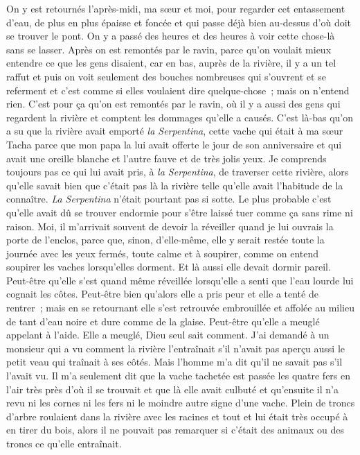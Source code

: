 \pend
%
\pstart
	On y est retournés l’après-midi, ma sœur et moi, pour regarder cet entassement d’eau, de plus en plus épaisse et foncée et qui passe déjà bien au-dessus d’où doit se trouver le pont. On y a passé des heures et des heures à voir cette chose-là sans se lasser. Après on est remontés par le ravin, parce qu’on voulait mieux entendre ce que les gens disaient, car en bas, auprès de la rivière, il y a un tel raffut et puis on voit seulement des bouches nombreuses qui s’ouvrent et se referment et c’est comme si elles voulaient dire quelque-chose ; mais on n’entend rien. C’est pour ça qu’on est remontés par le ravin, où il y a aussi des gens qui regardent la rivière et comptent les dommages qu’elle a causés. C’est là-bas qu’on a su que la rivière avait emporté \textit{la Serpentina}, cette vache qui était à ma sœur Tacha parce que mon papa la lui avait offerte le jour de son anniversaire et qui avait une oreille blanche et l’autre fauve et de très jolis yeux.
\pend
%
\pstart
	Je comprends toujours pas ce qui lui avait pris, à \textit{la Serpentina}, de traverser cette rivière, alors qu’elle savait bien que c’était pas là la rivière telle qu’elle avait l’habitude de la connaître. \textit{La Serpentina} n’était pourtant pas si sotte. Le plus probable c’est qu’elle avait dû se trouver endormie pour s’être laissé tuer comme ça sans rime ni raison. Moi, il m’arrivait souvent de devoir la réveiller quand je lui ouvrais la porte de l’enclos, parce que, sinon, d’elle-même, elle y serait restée toute la journée avec les yeux fermés, toute calme et à soupirer, comme on entend soupirer les vaches lorsqu’elles dorment.
\pend
%
\pstart
	Et là aussi elle devait dormir pareil. Peut-être qu’elle s’est quand même réveillée lorsqu’elle a senti que l’eau lourde lui cognait les côtes. Peut-être bien qu’alors elle a pris peur et elle a tenté de rentrer ; mais en se retournant elle s’est retrouvée embrouillée et affolée au milieu de tant d’eau noire et dure comme de la glaise. Peut-être qu’elle a meuglé appelant à l’aide.
\pend
%
\pstart
	Elle a meuglé, Dieu seul sait comment.
\pend
%
\pstart
	J’ai demandé à un monsieur qui a vu comment la rivière l’entraînait s’il n’avait pas aperçu aussi le petit veau qui traînait à ses côtés. Mais l’homme m’a dit qu’il ne savait pas s’il l’avait vu. Il m’a seulement dit que la vache tachetée est passée les quatre fers en l’air très près d’où il se trouvait et que là elle avait culbuté et qu’ensuite il n’a revu ni les cornes ni les fers ni le moindre autre signe d’une vache. Plein de troncs d’arbre roulaient dans la rivière avec les racines et tout et lui était très occupé à en tirer du bois, alors il ne pouvait pas remarquer si c’était des animaux ou des troncs ce qu’elle entraînait.
